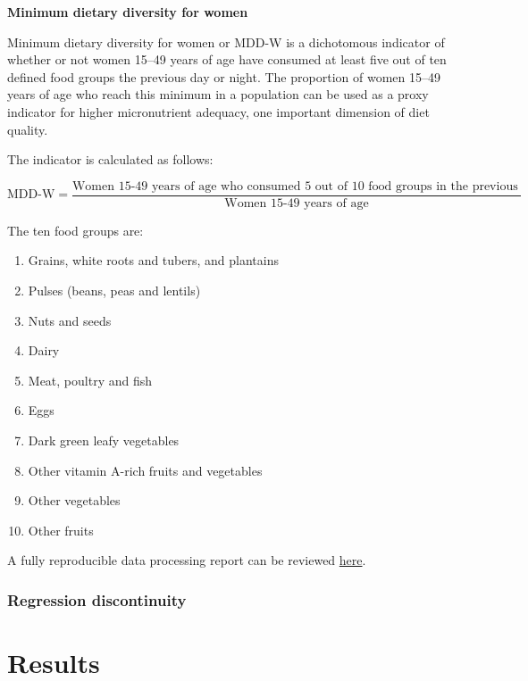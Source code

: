 \documentclass[12pt,a4paper]{article}
\providecommand{\tightlist}{%
  \setlength{\itemsep}{0pt}\setlength{\parskip}{0pt}}
\begin{document}
\textbf{Minimum dietary diversity for women}

Minimum dietary diversity for women or MDD-W is a dichotomous indicator of whether or not women 15--49 years of age have consumed at least five out of ten defined food groups the previous day or night. The proportion of women 15--49 years of age who reach this minimum in a population can be used as a proxy indicator for higher micronutrient adequacy, one important dimension of diet quality.

The indicator is calculated as follows:

\[ \text{MDD-W} = \frac{\text{Women 15-49 years of age who consumed 5 out of 10 food groups in the previous day or night}}{\text{Women 15-49 years of age}} \]

The ten food groups are:

\begin{enumerate}
\def\labelenumi{\arabic{enumi}.}
\tightlist
\item
  Grains, white roots and tubers, and plantains
\item
  Pulses (beans, peas and lentils)
\item
  Nuts and seeds
\item
  Dairy
\item
  Meat, poultry and fish
\item
  Eggs
\item
  Dark green leafy vegetables
\item
  Other vitamin A-rich fruits and vegetables
\item
  Other vegetables
\item
  Other fruits
\end{enumerate}

A fully reproducible data processing report can be reviewed \href{https://github.com/validmeasures/myanmarMCCTprocessing}{here}.

\hypertarget{regression-discontinuity}{%
\subsubsection{Regression discontinuity}\label{regression-discontinuity}}

\newpage

\hypertarget{results}{%
\section{Results}\label{results}}

\newpage
\end{document}
